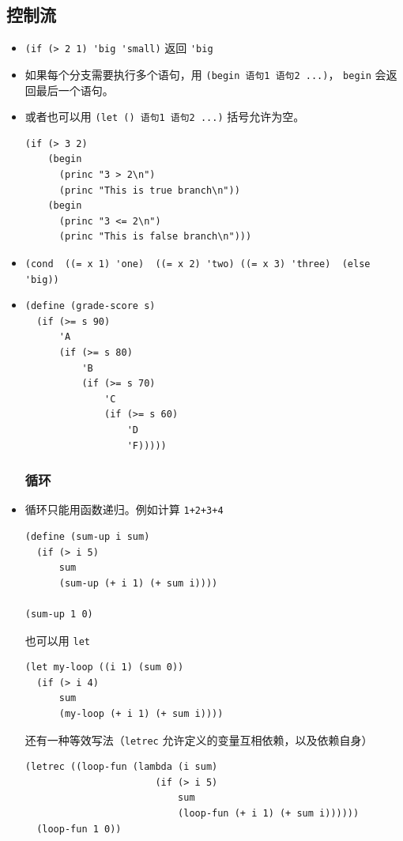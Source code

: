 \subsection{控制流}
\begin{itemize}
\item \verb`(if (> 2 1) 'big 'small)` 返回 \verb`'big`
\item 如果每个分支需要执行多个语句，用 \verb`(begin 语句1 语句2 ...)`， \verb`begin` 会返回最后一个语句。
\item 或者也可以用 \verb`(let () 语句1 语句2 ...)` 括号允许为空。
\begin{lstlisting}[language=none]
(if (> 3 2)
    (begin
      (princ "3 > 2\n")
      (princ "This is true branch\n"))
    (begin
      (princ "3 <= 2\n")
      (princ "This is false branch\n")))
\end{lstlisting}
\item \verb`(cond  ((= x 1) 'one)  ((= x 2) 'two) ((= x 3) 'three)  (else 'big))`
\item
\begin{lstlisting}[language=none]
(define (grade-score s)
  (if (>= s 90)
      'A
      (if (>= s 80)
          'B
          (if (>= s 70)
              'C
              (if (>= s 60)
                  'D
                  'F)))))
\end{lstlisting}

\subsubsection{循环}
\item 循环只能用函数递归。例如计算 \verb`1+2+3+4`
\begin{lstlisting}[language=none]
(define (sum-up i sum)
  (if (> i 5)
      sum
      (sum-up (+ i 1) (+ sum i))))

(sum-up 1 0)
\end{lstlisting}
也可以用 \verb`let`
\begin{lstlisting}[language=none]
(let my-loop ((i 1) (sum 0))
  (if (> i 4)
      sum
      (my-loop (+ i 1) (+ sum i))))
\end{lstlisting}
还有一种等效写法（\verb`letrec` 允许定义的变量互相依赖，以及依赖自身）
\begin{lstlisting}[language=none]
(letrec ((loop-fun (lambda (i sum)
                       (if (> i 5)
                           sum
                           (loop-fun (+ i 1) (+ sum i))))))
  (loop-fun 1 0))
\end{lstlisting}
\end{itemize}

